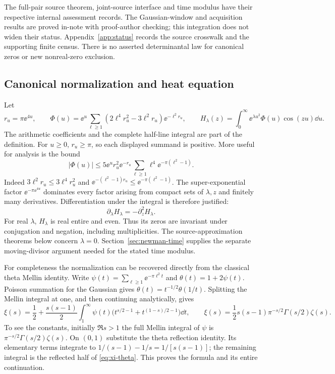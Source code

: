 The full-pair source theorem, joint-source interface and time modulus
have their respective internal assessment records. The Gaussian-window
and acquisition results are proved in-note with proof-author checking;
this integration does not widen their status. Appendix~\ref{app:status}
records the source crosswalk and the supporting finite census. There is
no asserted determinantal law for canonical zeros or new nonreal-zero
exclusion.

\subsection{Canonical normalization and heat equation}

Let
\begin{equation}\label{eq:source}
 r_u=\pi\ee^{4u},\qquad
 \Phi(u)=\ee^u\sum_{\ell\ge1}
       (2\ell^4r_u^2-3\ell^2r_u)\ee^{-\ell^2r_u},
 \qquad
 H_\lambda(z)=\int_0^\infty \ee^{\lambda u^2}\Phi(u)\cos(zu)\dd u .
\end{equation}
The arithmetic coefficients and the complete half-line integral are part
of the definition. For $u\ge0$, $r_u\ge\pi$, so each displayed summand
is positive. More useful for analysis is the bound
\begin{equation}\label{eq:source-basic-majorant}
 |\Phi(u)|\le
 5\ee^u r_u^2\ee^{-r_u}
 \sum_{\ell\ge1}\ell^4\ee^{-\pi(\ell^2-1)}.
\end{equation}
Indeed $3\ell^2r_u\le3\ell^4r_u^2$ and
$\ee^{-(\ell^2-1)r_u}\le\ee^{-\pi(\ell^2-1)}$.
The super-exponential factor $\ee^{-\pi\ee^{4u}}$ dominates every
factor arising from compact sets of $\lambda,z$ and finitely many
derivatives. Differentiation under the integral is therefore justified:
\begin{equation}\label{eq:heat}
 \partial_\lambda H_\lambda=-\partial_z^2H_\lambda .
\end{equation}
For real $\lambda$, $H_\lambda$ is real entire and even. Thus its zeros
are invariant under conjugation and negation, including multiplicities.
The source-approximation theorems below concern $\lambda=0$.
Section~\ref{sec:newman-time} supplies the separate moving-divisor
argument needed for the stated time modulus.

For completeness the normalization can be recovered directly from
the classical theta Mellin identity. Write
$\psi(t)=\sum_{\ell\ge1}\ee^{-\pi\ell^2t}$ and
$\theta(t)=1+2\psi(t)$. Poisson summation for the Gaussian gives
$\theta(t)=t^{-1/2}\theta(1/t)$. Splitting the Mellin integral at one,
and then continuing analytically, gives
\begin{equation}\label{eq:xi-theta}
 \xi(s)=\frac12+\frac{s(s-1)}2
 \int_1^\infty \psi(t)
   \bigl(t^{s/2-1}+t^{(1-s)/2-1}\bigr)\dd t ,
 \qquad
 \xi(s)=\frac12s(s-1)\pi^{-s/2}\Gamma(s/2)\zeta(s).
\end{equation}
To see the constants, initially $\Re s>1$ the full Mellin integral of
$\psi$ is $\pi^{-s/2}\Gamma(s/2)\zeta(s)$. On $(0,1)$ substitute the
theta reflection identity. Its elementary terms integrate to
$1/(s-1)-1/s=1/[s(s-1)]$; the remaining integral is the reflected
half of \eqref{eq:xi-theta}. This proves the formula and its entire
continuation.

